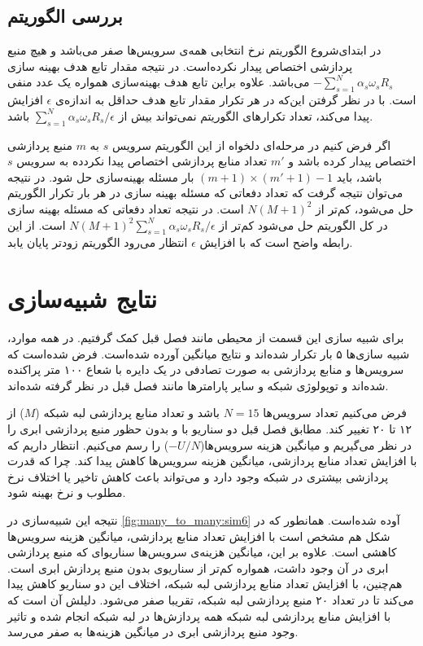     \subsection{بررسی الگوریتم}
      در ابتدای‌شروع الگوریتم نرخ انتخابی همه‌ی سرویس‌ها صفر می‌باشد و هیچ منبع پردازشی اختصاص پیدار نکرده‌است.
      در نتیجه مقدار تابع هدف بهینه سازی $-\sum_{s=1}^N \alpha_s \omega_s R_s$ می‌باشد.
      علاوه براین تابع هدف بهینه‌سازی همواره یک عدد منفی است.
      با در نظر گرفتن این‌که در هر تکرار مقدار تابع هدف حداقل به اندازه‌ی $\epsilon$ افزایش پیدا می‌کند، تعداد تکرار‌های الگوریتم نمی‌تواند بیش از $\sum_{s=1}^N  \alpha_s \omega_s R_s / \epsilon$  باشد.
      
      اگر فرض کنیم در مرحله‌ای دلخواه از این الگوریتم سرویس $s$ به $m$ منبع پردازشی اختصاص پیدار کرده باشد و $m'$ تعداد منابع پردازشی اختصاص پیدا نکردده به سرویس $s$ باشد، باید $(m+1) \times (m'+1) - 1$ بار مسئله بهینه‌سازی حل شود.
      در نتیجه می‌توان نتیجه گرفت که تعداد دفعاتی که مسئله بهینه سازی در هر بار تکرار الگوریتم حل می‌شود، کم‌تر از $N(M+1)^2$ است.
      در نتیجه تعداد دفعاتی که مسئله بهینه سازی در کل الگوریتم حل می‌شود کم‌تر از $N(M+1)^2 \sum_{s=1}^N  \alpha_s \omega_s R_s / \epsilon$ است.
      از این رابطه واضح است که با افزایش $\epsilon$ انتظار می‌رود الگوریتم زود‌تر پایان یابد.

  \section{نتایج شبیه‌سازی}
    برای شبیه سازی این قسمت از محیطی مانند فصل قبل کمک گرفتیم.
    در همه موارد، شبیه سازی‌ها ۵ بار تکرار شده‌اند و نتایج میانگین آورده شده‌است.
    فرض شده‌است که سرویس‌ها و منابع پردازشی به صورت تصادفی در یک دایره با شعاع ۱۰۰ متر پراکنده شده‌اند و توپولوژی شبکه و سایر پارامتر‌ها مانند فصل قبل در نظر گرفته شده‌اند.
    
    فرض می‌کنیم تعداد سرویس‌ها $N=15$ باشد و تعداد منابع پردازشی لبه شبکه ($M$) از ۱۲ تا ۲۰ تغییر کند.
    مطابق فصل قبل دو سناریو با و بدون حظور منبع پردازشی ابری را در نظر می‌گیریم و میانگین هزینه سرویس‌ها($-U/N$) را رسم می‌کنیم.
    انتظار داریم که با افزایش تعداد منابع پردازشی، میانگین هزینه سرویس‌ها کاهش پیدا کند. چرا که قدرت پردازشی بیشتری در شبکه وجود دارد و می‌تواند باعث کاهش تاخیر یا اختلاف نرخ مطلوب و نرخ بهینه شود.

    نتیجه این شبیه‌سازی در \cref{fig:many_to_many:sim6} آوده شده‌است.
    همانطور که در شکل هم مشخص است با افزایش تعداد منابع پردازشی، میانگین هزینه سرویس‌ها کاهشی است.
    علاوه بر این، میانگین هزینه‌ی سرویس‌ها سناریوای که منبع پردازشی ابری در آن وجود داشت، همواره کم‌تر از سناریوی بدون منبع پردازش ابری است.
    هم‌چنین، با افزایش تعداد منابع پردازشی لبه شبکه، اختلاف این دو سناریو کاهش پیدا می‌کند تا در تعداد ۲۰ منبع پردازشی لبه شبکه، تقریبا صفر می‌شود.
    دلیلش آن است که با افزایش منابع پردازشی لبه شبکه همه پردازش‌ها در لبه شبکه انجام شده و تاثیر وجود منبع پردازشی ابری در میانگین هزینه‌ها به صفر می‌رسد.

